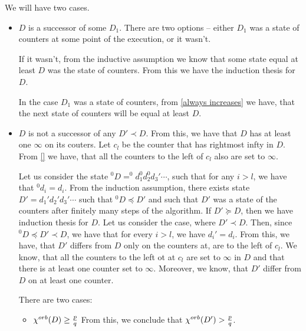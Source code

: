 We will have two cases. 
\begin{itemize}
\item $D$ is a successor of some $D_1$. 
There are two options -- either $D_1$ was a state of counters 
at some point of the execution, or it wasn't. 

If it wasn't, from the inductive assumption we know 
that some state equal at least $D$ was the state of counters. From this we have the induction 
thesis for $D$.

In the case $D_1$ was a state of counters, from \ref{always increases} we have, that the next 
state of counters will be equal at least $D$.  




% 


\item $D$ is not a successor of any $D' \prec D$. From this, we have that $D$ has at least one 
$\infty$ on its couters.  
Let $c_l$ be the counter that has rightmost infty in $D$. 
From \ref{} we have, that all the counters to the left of $c_l$ also are set to $\infty$.

Let us consider the state $^0D = ^0d_1^0d_2^0d_3'\cdots$, such that for any $i > l$, we have that 
$^0d_i = d_i$. From the induction assumption, there exists state $D' = d_1'd_2'd_3'\cdots$ 
such that $^0D\preceq D'$ and such that $D'$ was a state of the counters after finitely 
many steps of the algorithm. If $D' \succeq D$, then we have induction thesis for $D$. 
Let us consider the case, where $D' \prec D$. Then, since $^0D \preceq D' \prec D$, we have 
that for every $i > l$, we have $d_i' = d_i$. From this, we have, that $D'$ differs from 
$D$ only on the counters at, are to the left of $c_l$. We know, that all the counters 
to the left ot at $c_l$
are set to $\infty$ in $D$ and that there is at least one counter set to $\infty$. 
Moreover, we know, that $D'$ differ from $D$ on at least one counter.

There are two cases:
\begin{itemize}
\item ${\chi^{orb}(D)} \geq \frac{p}{q}$ 
From this, we conclude 
that ${\chi^{orb}(D')} > \frac{p}{q}$. 


\end{itemize}
\end{itemize}
